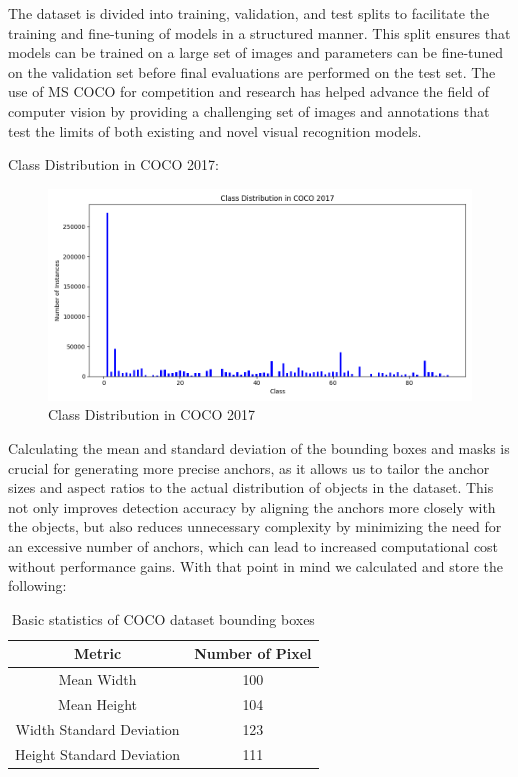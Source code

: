 The dataset is divided into training, validation, and test splits to facilitate the training and fine-tuning of models in a structured manner. 
This split ensures that models can be trained on a large set of images and parameters can be fine-tuned on the validation set before final evaluations 
are performed on the test set. The use of MS COCO for competition and research has helped advance the field of computer vision by providing a challenging 
set of images and annotations that test the limits of both existing and novel visual recognition models.

\newpage

Class Distribution in COCO 2017:

\begin{figure}[h!]
    \centering
    \includegraphics[scale=0.55]{Figures/coco2017_class_distribution.png}
    \caption{Class Distribution in COCO 2017}
    \label{fig:coco-class}
\end{figure}


Calculating the mean and standard deviation of the bounding boxes and masks is crucial for generating more precise anchors, as it allows us to tailor the anchor sizes 
and aspect ratios to the actual distribution of objects in the dataset. This not only improves detection accuracy by aligning the anchors more closely with the objects, 
but also reduces unnecessary complexity by minimizing the need for an excessive number of anchors, which can lead to increased computational cost without performance gains.
With that point in mind we calculated and store the following:

\begin{table}[h]
    \centering
    \begin{tabular}{|c|c|}
        \hline
        Metric                     & Number of Pixel   \\ \hline
        Mean Width                 & 100               \\ \hline
        Mean Height                & 104               \\ \hline
        Width Standard Deviation   & 123               \\ \hline
        Height Standard Deviation  & 111               \\ \hline
    \end{tabular}
    \caption{Basic statistics of COCO dataset bounding boxes}
    \label{tab:coco_bboxes}
\end{table}


